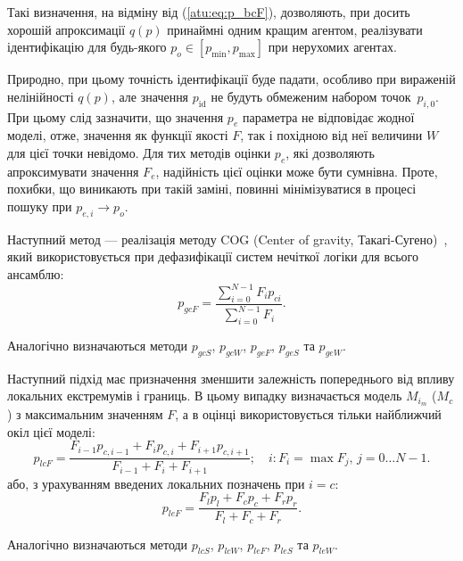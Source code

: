 Такі визначення, на відміну від (\ref{atu:eq:p_bcF}), дозволяють,
при досить хорошій апроксимації $q(p)$ принаймні одним кращим агентом,
реалізувати ідентифікацію для будь-якого
$p_o \in [p_{\min}, p_{\max}]$ при нерухомих агентах.

Природно, при цьому точність ідентифікації буде падати, особливо
при вираженій нелінійності
$ q (p) $, але значення
$ p_\mathrm{id} $ не будуть обмеженим набором точок~$p_{i,0}$.
При цьому слід зазначити, що значення
$p_e$ параметра не відповідає жодної моделі, отже, значення як
функції якості
$F$, так і похідною від неї величини
$W$ для цієї точки невідомо. Для тих методів оцінки
$p_e$, які дозволяють апроксимувати значення
$F_e$, надійність цієї оцінки може бути сумнівна. Проте, похибки,
що виникають при такій заміні, повинні мінімізуватися в процесі
пошуку при
$ p_{e, i} \to p_o $.


Наступний метод --- реалізація методу
COG (Center of gravity, Такагі-Сугено)~\cite{atu_asau25,atu_csit2015,atu_asau16},
який використовується при дефазифікації систем нечіткої логіки для всього
ансамблю:
%
\begin{equation}
  p_{gcF}
  =
  \frac{\sum\limits_{i=0}^{N-1} F_{i} p_{ci}}
       {\sum\limits_{i=0}^{N-1} F_{i} }
  .
  \label{atu:eq:p_gcF}
\end{equation}

Аналогічно визначаються методи
$p_{gcS}$,
$p_{gcW}$,
$p_{geF}$,
$p_{geS}$ та
$p_{geW}$.


Наступний підхід має призначення зменшити залежність попереднього від впливу локальних
екстремумів і границь. В цьому випадку визначається модель $M_{i_{m}}$ ($M_{c}$) з
максимальним значенням $F$, а в оцінці використовується тільки найближчий
окіл цієї моделі:
%
\begin{equation}
  p_{lcF}
  =
  \frac{ F_{i-1} p_{c,i-1} + F_{i} p_{c,i} + F_{i+1} p_{c,i+1} }
       { F_{i-1}           + F_{i}         + F_{i+1}         }
  ;
  \quad
  i : F_i = \max{F_j}, \, j=0 \ldots N-1 .
  \label{atu:eq:p_lcF}
\end{equation}
%
або, з урахуванням введених локальних позначень при $ i = c $:
%
\begin{equation}
  p_{leF}
  =
  \frac{ F_{l} p_{l} + F_{c} p_{c} + F_{r} p_{r} }
       { F_{l}       + F_{c}       + F_{r}       }
  .
  \label{atu:eq:p_lcFl}
\end{equation}

Аналогічно визначаються методи
$p_{lcS}$,
$p_{lcW}$,
$p_{leF}$,
$p_{leS}$ та
$p_{leW}$.

